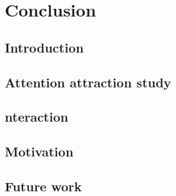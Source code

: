 \chapter{Conclusion} %

\label{Chapter10} %
\newpage






\section{Introduction}



\section{Attention attraction study}
\section{nteraction}
\section{Motivation}
\section{Future work}


